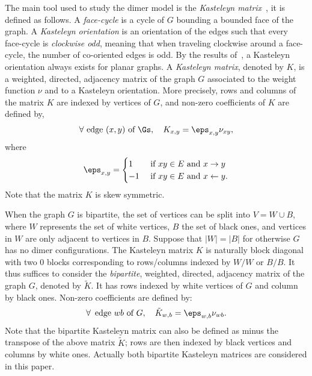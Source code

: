\documentclass[a4paper,twoside,11pt]{article}
\begin{document}
The main tool used to study the dimer model is the \emph{Kasteleyn matrix}~\cite{Kasteleyn1,Kasteleyn2,TF},
it is defined as follows. A \emph{face-cycle} is a cycle of $G$ bounding a bounded face of the graph. A
\emph{Kasteleyn orientation} is an orientation of the edges such that every face-cycle is \emph{clockwise odd}, meaning
that when traveling clockwise around a face-cycle, the number of co-oriented edges is odd. By the results 
of~\cite{Kasteleyn2}, a Kasteleyn orientation always exists for planar graphs. A \emph{Kasteleyn matrix},
denoted by $K$, is a 
weighted, directed, adjacency matrix of the graph $G$ associated to the weight function $\nu$ and to a Kasteleyn orientation. More
precisely, rows and columns of the matrix $K$ are indexed by vertices of $G$, and non-zero coefficients of $K$ are defined by,
\begin{align*}
\forall\text{ edge $(x,y)$ of $\Gs$},\quad K_{x,y}=\eps_{x,y}\nu_{xy},
\end{align*}
where
\begin{align*}
\eps_{x,y}=
\begin{cases}
1&\text{ if $xy\in E$ and $x\rightarrow y$}\\
-1&\text{ if $xy\in E$ and $x\leftarrow y$}.
\end{cases}
\end{align*}
Note that the matrix $K$ is skew symmetric. 

When the graph $G$ is bipartite, the set of vertices can be split into $V=W\cup B$, where $W$
represents the set of white vertices, $B$ the set of black ones, and vertices in $W$ are only adjacent to vertices in $B$.
Suppose that $|W|=|B|$ for otherwise $G$ has no dimer configurations.
The Kasteleyn matrix $K$ is naturally block diagonal with two 0 blocks corresponding to rows/columns indexed by 
$W/W$ or $B/B$. It thus suffices to consider the \emph{bipartite}, weighted, directed, adjacency matrix of the graph $G$, denoted 
by $\tilde{K}$. It has rows indexed by white vertices of $G$ and column by black ones. Non-zero coefficients are defined by:
\begin{align*}
\forall\,\text{ edge $wb$ of $G$},\quad \tilde{K}_{w,b}=\eps_{w,b}\nu_{wb}.
\end{align*}
Note that the bipartite Kasteleyn matrix can also be defined 
as minus the transpose of the above matrix $\tilde{K}$; rows are then indexed by black vertices and columns by 
white ones. Actually both bipartite Kasteleyn matrices are considered in this paper.
\end{document}
